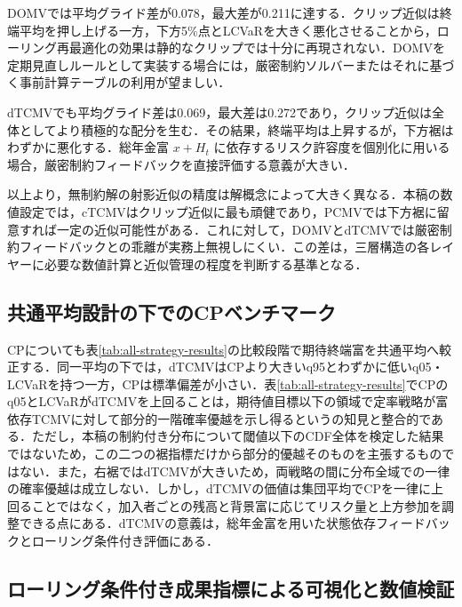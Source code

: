 \documentclass[10pt,a4paper]{article}
\theoremstyle{plain}
\theoremstyle{definition}
\begin{document}
DOMVでは平均グライド差が0.078，最大差が0.211に達する．クリップ近似は終端平均を押し上げる一方，下方5\%点とLCVaRを大きく悪化させることから，ローリング再最適化の効果は静的なクリップでは十分に再現されない．DOMVを定期見直しルールとして実装する場合には，厳密制約ソルバーまたはそれに基づく事前計算テーブルの利用が望ましい．

dTCMVでも平均グライド差は0.069，最大差は0.272であり，クリップ近似は全体としてより積極的な配分を生む．その結果，終端平均は上昇するが，下方裾はわずかに悪化する．総年金富 $x+H_t$ に依存するリスク許容度を個別化に用いる場合，厳密制約フィードバックを直接評価する意義が大きい．

以上より，無制約解の射影近似の精度は解概念によって大きく異なる．本稿の数値設定では，cTCMVはクリップ近似に最も頑健であり，PCMVでは下方裾に留意すれば一定の近似可能性がある．これに対して，DOMVとdTCMVでは厳密制約フィードバックとの乖離が実務上無視しにくい．この差は，三層構造の各レイヤーに必要な数値計算と近似管理の程度を判断する基準となる．

\subsection{共通平均設計の下でのCPベンチマーク}

CPについても表\ref{tab:all-strategy-results}の比較段階で期待終端富を共通平均へ較正する．同一平均の下では，dTCMVはCPより大きいq95とわずかに低いq05・LCVaRを持つ一方，CPは標準偏差が小さい．表\ref{tab:all-strategy-results}でCPのq05とLCVaRがdTCMVを上回ることは，期待値目標以下の領域で定率戦略が富依存TCMVに対して部分的一階確率優越を示し得るという\citet{vanStadenDangForsyth2021}の知見と整合的である．ただし，本稿の制約付き分布について閾値以下のCDF全体を検定した結果ではないため，この二つの裾指標だけから部分的優越そのものを主張するものではない．また，右裾ではdTCMVが大きいため，両戦略の間に分布全域での一律の確率優越は成立しない．しかし，dTCMVの価値は集団平均でCPを一律に上回ることではなく，加入者ごとの残高と背景富に応じてリスク量と上方参加を調整できる点にある．dTCMVの意義は，総年金富を用いた状態依存フィードバックとローリング条件付き評価にある．

\subsection{ローリング条件付き成果指標による可視化と数値検証}
\label{sec:rolling-results}
\end{document}
